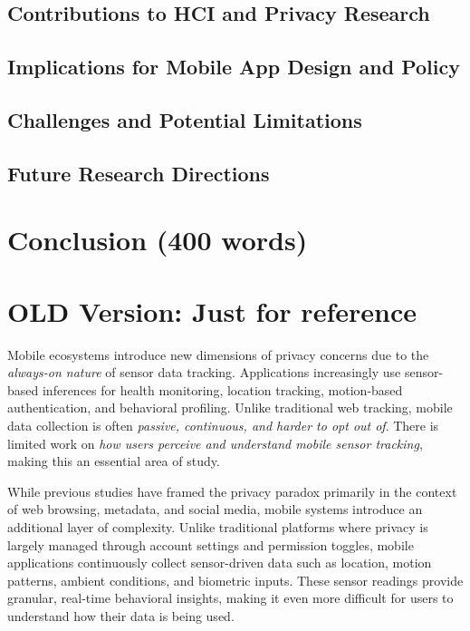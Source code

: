 \documentclass[acmlarge, nonacm]{acmart}
\begin{document}
\subsection{Contributions to HCI and Privacy Research}

\subsection{Implications for Mobile App Design and Policy}

\subsection{Challenges and Potential Limitations}

\subsection{Future Research Directions}

\section{Conclusion (400 words)}


















\section{OLD Version:  Just for reference}

Mobile ecosystems introduce new dimensions of privacy concerns due to the \textit{always-on nature} of sensor data tracking. Applications increasingly use sensor-based inferences for health monitoring, location tracking, motion-based authentication, and behavioral profiling. Unlike traditional web tracking, mobile data collection is often \textit{passive, continuous, and harder to opt out of}. There is limited work on \textit{how users perceive and understand mobile sensor tracking}, making this an essential area of study.

While previous studies have framed the privacy paradox primarily in the context of web browsing, metadata, and social media, mobile systems introduce an additional layer of complexity. Unlike traditional platforms where privacy is largely managed through account settings and permission toggles, mobile applications continuously collect sensor-driven data such as location, motion patterns, ambient conditions, and biometric inputs. These sensor readings provide granular, real-time behavioral insights, making it even more difficult for users to understand how their data is being used.
\end{document}
